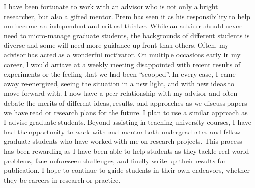 \documentclass[10pt]{article}
\begin{document}
I have been fortunate to work with an advisor who is not only a bright
researcher, but also a gifted mentor.  Prem has seen it as his responsibility
to help me become an independent and critical thinker.  While an advisor should
never need to micro-manage graduate students, the backgrounds of different
students is diverse and some will need more guidance up front than others.
Often, my advisor has acted as a wonderful motivator.  On multiple occasions
early in my career, I would arriave at a weekly meeting disappointed with
recent results of experiments or the feeling that we had been ``scooped''.  In
every case, I came away re-energized, seeing the situation in a new light, and
with new ideas to move forward with.  I now have a peer relationship with my
advisor and often debate the merits of different ideas, results, and approaches
as we discuss papers we have read or research plans for the future.  I plan to
use a similar approach as I advise graduate students.  Beyond assisting in
teaching university courses, I have had the opportunity to work with and mentor
both undergraduates and fellow graduate students who have worked with me on
research projects.  This process has been rewarding as I have been able to help
students as they tackle real world problems, face unforeseen challenges, and
finally write up their results for publication.  I hope to continue to guide
students in their own endeavors, whether they be careers in research or
practice.
\end{document}
